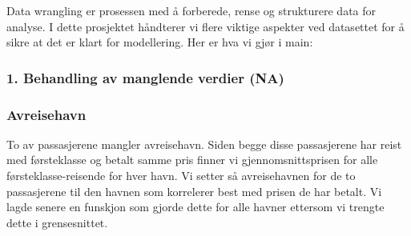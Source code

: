 \documentclass[
]{article}
\newenvironment{Shaded}{\begin{snugshade}}{\end{snugshade}}
\newcommand{\AttributeTok}[1]{\textcolor[rgb]{0.13,0.29,0.53}{#1}}
\newcommand{\ConstantTok}[1]{\textcolor[rgb]{0.56,0.35,0.01}{#1}}
\newcommand{\DecValTok}[1]{\textcolor[rgb]{0.00,0.00,0.81}{#1}}
\newcommand{\FunctionTok}[1]{\textcolor[rgb]{0.13,0.29,0.53}{\textbf{#1}}}
\newcommand{\NormalTok}[1]{#1}
\newcommand{\OtherTok}[1]{\textcolor[rgb]{0.56,0.35,0.01}{#1}}
\newcommand{\SpecialCharTok}[1]{\textcolor[rgb]{0.81,0.36,0.00}{\textbf{#1}}}
\newcommand{\StringTok}[1]{\textcolor[rgb]{0.31,0.60,0.02}{#1}}
\begin{document}
Data wrangling er prosessen med å forberede, rense og strukturere data
for analyse. I dette prosjektet håndterer vi flere viktige aspekter ved
datasettet for å sikre at det er klart for modellering. Her er hva vi
gjør i main:

\begin{Shaded}
\end{Shaded}

\subsubsection{1. Behandling av manglende verdier
(NA)}\label{behandling-av-manglende-verdier-na}

\subsubsection{Avreisehavn}\label{avreisehavn}

To av passasjerene mangler avreisehavn. Siden begge disse passasjerene
har reist med førsteklasse og betalt samme pris finner vi
gjennomsnittsprisen for alle førsteklasse-reisende for hver havn. Vi
setter så avreisehavnen for de to passasjerene til den havnen som
korrelerer best med prisen de har betalt. Vi lagde senere en funskjon
som gjorde dette for alle havner ettersom vi trengte dette i
grensesnittet.
\end{document}
